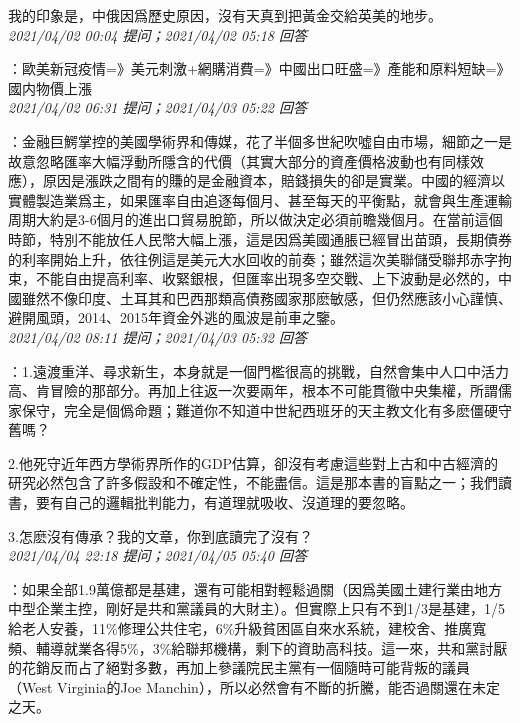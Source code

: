 \documentclass[twocolumn]{ctexart}
\begin{document}
我的印象是，中俄因爲歷史原因，沒有天真到把黃金交給英美的地步。
\\

\textit{\hfill\noindent\small 2021/04/02 00:04 提问；2021/04/02 05:18 回答}

：歐美新冠疫情=》美元刺激+網購消費=》中國出口旺盛=》產能和原料短缺=》國内物價上漲
\\

\textit{\hfill\noindent\small 2021/04/02 06:31 提问；2021/04/03 05:22 回答}

：金融巨鰐掌控的美國學術界和傳媒，花了半個多世紀吹噓自由市場，細節之一是故意忽略匯率大幅浮動所隱含的代價（其實大部分的資產價格波動也有同樣效應），原因是漲跌之間有的賺的是金融資本，賠錢損失的卻是實業。中國的經濟以實體製造業爲主，如果匯率自由追逐每個月、甚至每天的平衡點，就會與生產運輸周期大約是3-6個月的進出口貿易脫節，所以做決定必須前瞻幾個月。在當前這個時節，特別不能放任人民幣大幅上漲，這是因爲美國通脹已經冒出苗頭，長期債券的利率開始上升，依往例這是美元大水回收的前奏；雖然這次美聯儲受聯邦赤字拘束，不能自由提高利率、收緊銀根，但匯率出現多空交戰、上下波動是必然的，中國雖然不像印度、土耳其和巴西那類高債務國家那麽敏感，但仍然應該小心謹慎、避開風頭，2014、2015年資金外逃的風波是前車之鑒。
\\

\textit{\hfill\noindent\small 2021/04/02 08:11 提问；2021/04/03 05:32 回答}

：1.遠渡重洋、尋求新生，本身就是一個門檻很高的挑戰，自然會集中人口中活力高、肯冒險的那部分。再加上往返一次要兩年，根本不可能貫徹中央集權，所謂儒家保守，完全是個僞命題；難道你不知道中世紀西班牙的天主教文化有多麽僵硬守舊嗎？

2.他死守近年西方學術界所作的GDP估算，卻沒有考慮這些對上古和中古經濟的研究必然包含了許多假設和不確定性，不能盡信。這是那本書的盲點之一；我們讀書，要有自己的邏輯批判能力，有道理就吸收、沒道理的要忽略。

3.怎麽沒有傳承？我的文章，你到底讀完了沒有？
\\

\textit{\hfill\noindent\small 2021/04/04 22:18 提问；2021/04/05 05:40 回答}

：如果全部1.9萬億都是基建，還有可能相對輕鬆過關（因爲美國土建行業由地方中型企業主控，剛好是共和黨議員的大財主）。但實際上只有不到1/3是基建，1/5給老人安養，11\%修理公共住宅，6\%升級貧困區自來水系統，建校舍、推廣寬頻、輔導就業各得5\%，3\%給聯邦機構，剩下的資助高科技。這一來，共和黨討厭的花銷反而占了絕對多數，再加上參議院民主黨有一個隨時可能背叛的議員（West Virginia的Joe Manchin），所以必然會有不斷的折騰，能否過關還在未定之天。
\end{document}
